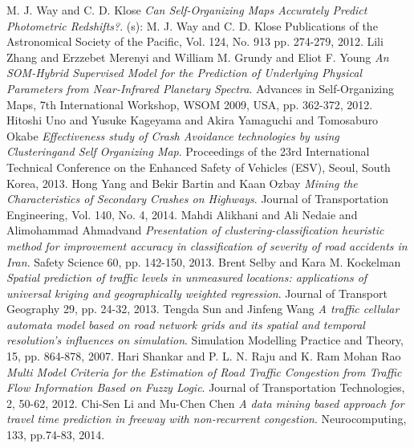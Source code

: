 \documentclass[hyperref={pdfpagelabels=true}]{beamer}
\begin{document}
\begin{frame}[allowframebreaks]
{\begin{thebibliography}{ab}
   M. J. Way and C. D. Klose {\em Can Self-Organizing Maps Accurately Predict Photometric Redshifts?}. (s): M. J. Way and C. D. Klose
 Publications of the Astronomical Society of the Pacific, Vol. 124, No. 913 pp. 274-279, 2012.
   Lili Zhang and Erzzebet Merenyi and William M. Grundy and Eliot F. Young {\em An SOM-Hybrid Supervised Model for the Prediction of Underlying Physical Parameters from Near-Infrared Planetary Spectra}. Advances in Self-Organizing Maps, 7th International Workshop, WSOM 2009, USA, pp. 362-372, 2012.
   Hitoshi Uno and Yusuke Kageyama and Akira Yamaguchi and Tomosaburo Okabe {\em Effectiveness study of Crash Avoidance technologies by using Clusteringand Self Organizing Map}. Proceedings of the 23rd International Technical Conference on the Enhanced Safety of Vehicles (ESV), Seoul, South Korea, 2013.
   Hong Yang and Bekir Bartin and Kaan Ozbay {\em Mining the Characteristics of Secondary Crashes on Highways}. Journal of Transportation Engineering, Vol. 140, No. 4, 2014.  
   Mahdi Alikhani and Ali Nedaie and Alimohammad Ahmadvand {\em Presentation of clustering-classification heuristic method for improvement accuracy in classification of severity of road accidents in Iran}. Safety Science 60, pp. 142-150, 2013.
   Brent Selby and Kara M. Kockelman {\em Spatial prediction of traffic levels in unmeasured locations: applications of universal kriging and geographically weighted regression}. Journal of Transport Geography 29, pp. 24-32, 2013.
   Tengda Sun and Jinfeng Wang {\em A traffic cellular automata model based on road network grids and its spatial and temporal resolution's influences on simulation}. Simulation Modelling Practice and Theory, 15, pp. 864-878, 2007.
   Hari Shankar and P. L. N. Raju and K. Ram Mohan Rao {\em Multi Model Criteria for the Estimation of Road Traffic Congestion from Traffic Flow Information Based on Fuzzy Logic}. Journal of Transportation Technologies, 2, 50-62, 2012.
   Chi-Sen Li and Mu-Chen Chen {\em A data mining based approach for travel time prediction in freeway with non-recurrent congestion}. Neurocomputing, 133, pp.74-83, 2014.
  \end{thebibliography}
 }
\end{frame}
\end{document}
